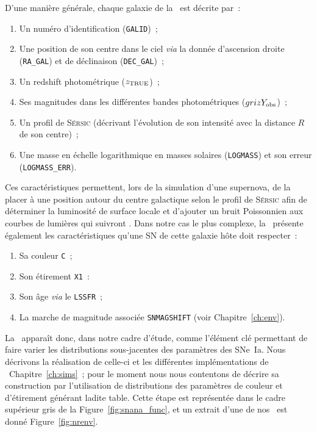 \documentclass[../main/main.tex]{subfiles}
\begin{document}
D'une manière générale, chaque galaxie de la \hostlib\ est décrite par~:
\begin{enumerate}
    \item Un numéro d'identification (\texttt{GALID})~;
    \item Une position de son centre dans le ciel \textit{via} la donnée
        d'ascension droite (\texttt{RA\_GAL}) et de déclinaison
        (\texttt{DEC\_GAL})~;
    \item Un redshift photométrique ($z_{\rm TRUE}$)~;
    \item Ses magnitudes dans les différentes bandes photométriques ($grizY_{\rm
        obs}$)~;
    \item Un profil de \textsc{Sérsic} (décrivant l'évolution de son intensité
        avec la distance $R$ de son centre)~;
    \item Une masse en échelle logarithmique en masses solaires
        (\texttt{LOGMASS}) et son erreur (\texttt{LOGMASS\_ERR}).
\end{enumerate}
Ces caractéristiques permettent, lors de la simulation d'une supernova, de la
placer à une position autour du centre galactique selon le profil de
\textsc{Sérsic} afin de déterminer la luminosité de surface locale et d'ajouter
un bruit Poissonnien aux courbes de lumières qui suivront \citep{kessler2019}.
Dans notre cas le plus complexe, la \hostlib\ présente également les
caractéristiques qu'une SN de cette galaxie hôte doit respecter~:
\begin{enumerate}[resume]
    \item Sa couleur \texttt{C}~;
    \item Son étirement \texttt{X1}~:
    \item Son âge \textit{via} le \texttt{LSSFR}~;
    \item La marche de magnitude associée \texttt{SNMAGSHIFT} (voir
        Chapitre~\ref{ch:env}).
\end{enumerate}
La \hostlib\ apparaît donc, dans notre cadre d'étude, comme l'élément clé
permettant de faire varier les distributions sous-jacentes des paramètres des
SNe~Ia. Nous décrivons la réalisation de celle-ci et les différentes
implémentations de \hostlib\ Chapitre~\ref{ch:sims}~; pour le moment nous nous
contentons de décrire sa construction par l'utilisation de distributions des
paramètres de couleur et d'étirement générant ladite table. Cette étape est
représentée dans le cadre supérieur gris de la Figure~\ref{fig:snana_func}, et
un extrait d'une de nos \hostlib\ est donné Figure~\ref{fig:nrenv}.
\end{document}
